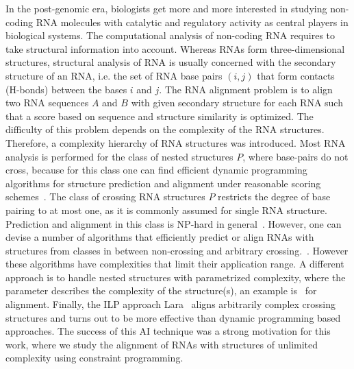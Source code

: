 \documentclass[11pt]{llncs}
\begin{document}
In the post-genomic era, biologists get more and more interested in
studying non-coding RNA molecules with catalytic and regulatory
activity as central players in biological systems. 
%
The computational analysis of non-coding RNA requires to take
structural information into account.
%
Whereas RNAs form three-dimensional structures, structural analysis of
RNA is usually concerned with the secondary structure of an RNA, i.e.
the set of RNA base pairs $(i,j)$ that form contacts (H-bonds) between
the bases $i$ and $j$. The RNA alignment problem is to align two RNA
sequences $A$ and $B$ with given secondary structure for each RNA such
that a score based on sequence and structure similarity is
optimized. The difficulty of this problem depends on the complexity of
the RNA structures. Therefore, a complexity hierarchy of RNA
structures was introduced. Most RNA analysis is performed for the
class of nested structures $P$, where base-pairs do not cross, because
for this class one can find efficient dynamic programming algorithms
for structure prediction and alignment under reasonable scoring
schemes~\cite{Zuker:Stiegler:Optim_compu_foldi:NAR1981,Jiang:Lin:Ma:Gener_Edit_Dista:JCB2002}. The
class of crossing RNA structures $P$ restricts the degree of base
pairing to at most one, as it is commonly assumed for single RNA
structure. Prediction and alignment in this class is NP-hard in
general~\cite{blin07:_exten_hardn_rna_secon_struc_compar}. However,
one can devise a number of algorithms that efficiently predict or
align RNAs with structures from classes in between non-crossing and
arbitrary
crossing.~\cite{Rivas:Eddy:dynam_progr_algor:JMB1999,Reeder:Giegerich:Desig_imple_and:2004,Moehl:Will:Backofen:PKalign:JCB2010}. However
these algorithms have complexities that limit their application
range. A different approach is to handle nested structures with
parametrized complexity, where the parameter describes the complexity
of the structure(s), an example is~\cite{Moehl:Will:Backofen:CPM2008}
for alignment.  Finally, the ILP approach
Lara~\cite{Bauer:Klau:Reinert:Accur_multi_seque:2007} aligns
arbitrarily complex crossing structures and turns out to be more
effective than dynamic programming based approaches. The success of
this AI technique was a strong motivation for this work, where we
study the alignment of RNAs with structures of unlimited complexity
using constraint programming.
\end{document}
